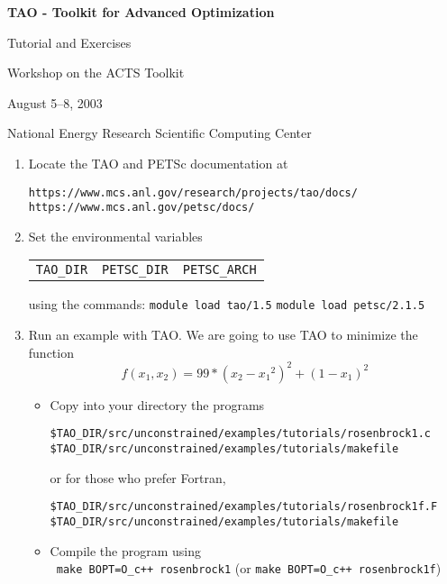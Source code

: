 \documentclass[11pt]{article}
\begin{document}
\begin{center}
{\bf
TAO - Toolkit for Advanced Optimization
        
Tutorial and Exercises

\vspace{0.25in}

Workshop on the ACTS Toolkit

August 5--8, 2003

National Energy Research Scientific Computing Center
}
\end{center}
\vspace{0.25in}

\begin{enumerate}

\item Locate the TAO and PETSc documentation at 
\begin{alltt}
https://www.mcs.anl.gov/research/projects/tao/docs/
https://www.mcs.anl.gov/petsc/docs/
\end{alltt}

\item Set the environmental variables\\
\begin{tabular}{ccc}
\texttt{TAO\_DIR} & \texttt{PETSC\_DIR} & \texttt{PETSC\_ARCH} 
\end{tabular}
using the commands:
\quad \texttt{module load tao/1.5}
\quad \texttt{module load petsc/2.1.5}


\item Run an example with TAO.
We are going to use TAO to minimize the function 
\[
    f(x_1,x_2) = 99*(x_2-{x_1}^2)^2 + (1-x_1)^2 
\]

\begin{itemize}
 \item Copy into your directory the programs
  \begin{alltt}
    \$TAO_DIR/src/unconstrained/examples/tutorials/rosenbrock1.c
    \$TAO_DIR/src/unconstrained/examples/tutorials/makefile
  \end{alltt}
  or for those who prefer Fortran,
  \begin{alltt}
    \$TAO_DIR/src/unconstrained/examples/tutorials/rosenbrock1f.F
    \$TAO_DIR/src/unconstrained/examples/tutorials/makefile
  \end{alltt}

 \item Compile the program using \\
  \quad \texttt{ make BOPT=O\_c++ rosenbrock1} 
  (or \texttt{make BOPT=O\_c++ rosenbrock1f})


\end{itemize}
\end{enumerate}
\end{document}
